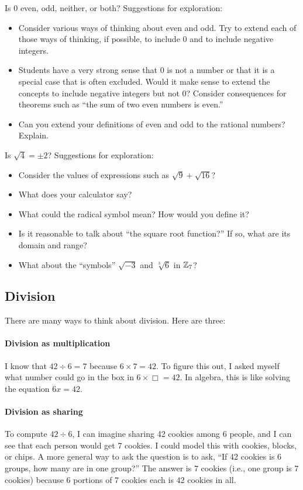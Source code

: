 \documentclass[space,nooutcomes]{ximera}
\begin{document}
\begin{problem}
Is 0 even, odd, neither, or both?  Suggestions for exploration:  
\begin{itemize}
\item Consider various ways of thinking about even and odd.  Try to extend each of those ways of thinking, if possible, to include 0 and to include negative integers.     
\item Students have a very strong sense that 0 is not a number or that it is a special case that is often excluded.  Would it make sense to extend the concepts to include negative integers but not 0?  Consider consequences for theorems such as ``the sum of two even numbers is even.''
\item Can you extend your definitions of even and odd to the rational numbers?  Explain.  
\end{itemize}
\end{problem}

\begin{problem}
Is $\sqrt{4}=\pm 2$?  Suggestions for exploration:  
\begin{itemize} 
\item Consider the values of expressions such as $\sqrt{9}+\sqrt{16}$?  
\item What does your calculator say?  
\item What could the radical symbol mean?  How would you define it?  
\item Is it reasonable to talk about ``the square root function?''  If so, what are its domain and range? 
\item What about the ``symbols'' $\sqrt{-3}$ and $\sqrt[3]{6}$ in $\mathbb Z_7$?  
\end{itemize}
\end{problem}

\subsection*{Division}
There are many ways to think about division.  Here are three:

\paragraph{Division as multiplication}  I know that $42\div 6=7$ because $6\times 7=42$.  To figure this out, I asked myself what number could go in the box in $6\times \Box =42$.  In algebra, this is like solving the equation $6x=42$.

\paragraph{Division as sharing}  To compute $42\div 6$, I can imagine sharing 42 cookies among 6 people, and I can see that each person would get 7 cookies.  I could model this with cookies, blocks, or chips.  A more general way to ask the question is to ask, ``If 42 cookies is 6 groups, how many are in one group?''  The answer is 7 cookies (i.e., one group is 7 cookies) because 6 portions of 7 cookies each is 42 cookies in all.  
\end{document}
